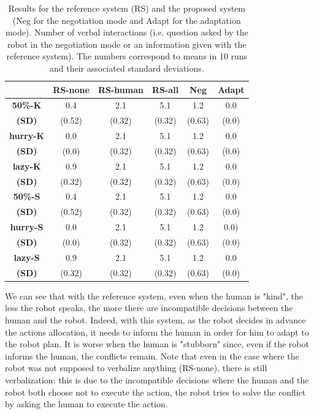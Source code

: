 \documentclass[english,a4paper,11pt,twoside]{StyleThese}
\begin{document}
\begin{table}[!h]
  \begin{tabular}{|c||c|c|c|c|c||}
  \hline
     & \textbf{RS-none} & \textbf{RS-human} & \textbf{RS-all} & \textbf{Neg} & \textbf{Adapt} \\
  \hline
  \hline
     \textbf{50\%-K} & 0.4 & 2.1 & 5.1 & 1.2 & 0.0 \\
     \textbf{(SD)} & (0.52) & (0.32) & (0.32) & (0.63) & (0.0) \\
  \hline
     \textbf{hurry-K} & 0.0 & 2.1 & 5.1 & 1.2 & 0.0 \\
     \textbf{(SD)} & (0.0) & (0.32) & (0.32) & (0.63) & (0.0) \\
  \hline
     \textbf{lazy-K} & 0.9 & 2.1 & 5.1 & 1.2 & 0.0 \\
     \textbf{(SD)} & (0.32) & (0.32) & (0.32) & (0.63) & (0.0) \\
  \hline
     \textbf{50\%-S} & 0.4 & 2.1 & 5.1 & 1.2 & 0.0 \\
     \textbf{(SD)} & (0.52) & (0.32) & (0.32) & (0.63) & (0.0) \\
  \hline
     \textbf{hurry-S} & 0.0 & 2.1 & 5.1 & 1.2 & 0.0) \\
     \textbf{(SD)} & (0.0) & (0.32) & (0.32) & (0.63) & (0.0) \\
  \hline
     \textbf{lazy-S} & 0.9 & 2.1 & 5.1 & 1.2 & 0.0 \\
     \textbf{(SD)} & (0.32) & (0.32) & (0.32) & (0.63) & (0.0) \\
  \hline
  \end{tabular}
   \caption{Results for the reference system (RS) and the proposed system (Neg for the negotiation mode and Adapt for the adaptation mode). Number of verbal interactions (i.e. question asked by the robot in the negotiation mode or an information given with the reference system). The numbers correspond to means in 10 runs and their associated standard deviations.}
   \label{tab:verb}
\end{table}

We can see that with the reference system, even when the human is "kind", the less the robot speaks, the more there are incompatible decisions between the human and the robot. Indeed, with this system, as the robot decides in advance the actions allocation, it needs to inform the human in order for him to adapt to the robot plan. It is worse when the human is "stubborn" since, even if the robot informs the human, the conflicts remain. Note that even in the case where the robot was not supposed to verbalize anything (RS-none), there is still verbalization: this is due to the incompatible decisions where the human and the robot both choose not to execute the action, the robot tries to solve the conflict by asking the human to execute the action.
\end{document}
